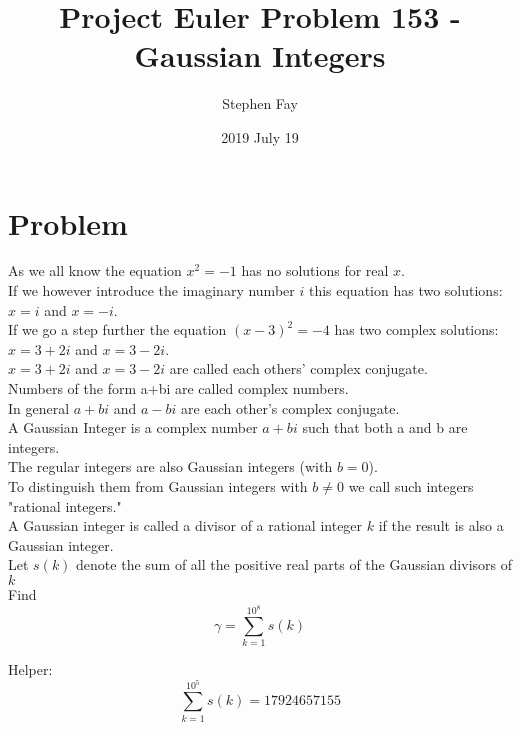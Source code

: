 \documentclass[11pt]{article}
\renewcommand\qedsymbol{$\Smiley$}
\begin{document}
 
 
\title{Project Euler Problem 153 - Gaussian Integers}
\author{Stephen Fay}
\date{2019 July 19}
\maketitle

\tableofcontents

\section{Problem}
As we all know the equation $x^2=-1$ has no solutions for real $x$.\\
If we however introduce the imaginary number $i$ this equation has two solutions: $x=i$ and $x=-i$.\\
If we go a step further the equation $(x-3)^2=-4$ has two complex solutions: $x=3+2i$ and $x=3-2i$.\\
$x=3+2i$ and $x=3-2i$ are called each others' complex conjugate.\\
Numbers of the form a+bi are called complex numbers.\\
In general $a+bi$ and $a−bi$ are each other's complex conjugate.\\

A Gaussian Integer is a complex number $a+bi$ such that both a and b are integers.\\
The regular integers are also Gaussian integers (with $b=0$).\\
To distinguish them from Gaussian integers with $b \neq 0$ we call such integers "rational integers."\\
A Gaussian integer is called a divisor of a rational integer $k$ if the result is also a Gaussian integer.\\

Let $s(k)$ denote the sum of all the positive real parts of the Gaussian divisors of $k$\\

Find \begin{equation}\label{equation: the summation}\gamma=\sum_{k=1}^{10^8}s(k)\end{equation}

Helper: \begin{equation}\label{equation: given sum}\sum_{k=1}^{10^5}s(k) = 17924657155\end{equation}
\end{document}
